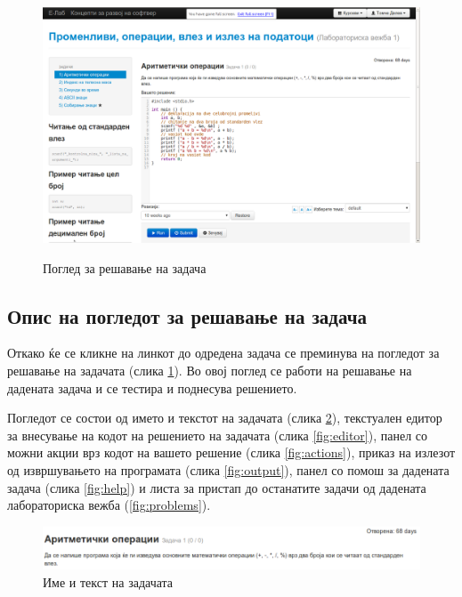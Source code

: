 \begin{figure}[htbp]
\centering
\includegraphics[width=\textwidth]{images/code/screen}
\label{fig:screen}
\caption{Поглед за решавање на задача}
\end{figure}

\subsection{Опис на погледот за решавање на задача}

Откако ќе се кликне на линкот до одредена задача се преминува на погледот за
решавање на задачата (слика \ref{fig:screen}). Во овој поглед се работи на
решавање на дадената задача и се тестира и поднесува решението.

Погледот се состои од името и текстот на задачата (слика \ref{fig:text}),
текстуален едитор за внесување на кодот на решението на задачата (слика
\ref{fig:editor}), панел со можни акции врз кодот на вашето решение (слика
\ref{fig:actions}), приказ на излезот од извршувањето на програмата (слика
\ref{fig:output}), панел со помош за дадената задача (слика \ref{fig:help}) и
листа за пристап до останатите задачи од дадената лабораториска вежба
(\ref{fig:problems}).

\begin{figure}[htbp]
\centering
\includegraphics[scale=.4]{images/code/text}
\caption{Име и текст на задачата}
\label{fig:text}
\end{figure}

